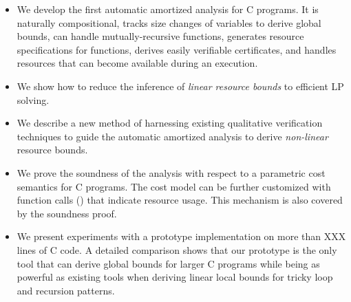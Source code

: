 \documentclass[nocopyrightspace,preprint]{sigplanconf}
\begin{document}
\begin{itemize}
\item We develop the first automatic amortized analysis for C
  programs. It is naturally compositional, tracks size changes of
  variables to derive global bounds, can handle mutually-recursive
  functions, generates resource specifications for functions, derives
  easily verifiable certificates, and handles resources that can
  become available during an execution.
\item We show how to reduce the inference of \emph{linear resource
    bounds} to efficient LP solving.
\item We describe a new method of harnessing existing qualitative
  verification techniques to guide the automatic amortized analysis
  to derive \emph{non-linear} resource bounds.
\item We prove the soundness of the analysis with respect to a
  parametric cost semantics for C programs. The cost model can be
  further customized with function calls () that
  indicate resource usage. This mechanism is also covered by the
  soundness proof.
\item We present experiments with a prototype implementation on more
  than XXX lines of C code. A detailed comparison shows that our
  prototype is the only tool that can derive global bounds for larger
  C programs while being as powerful as existing tools when deriving
  linear local bounds for tricky loop and recursion patterns.
\end{itemize}
\end{document}
